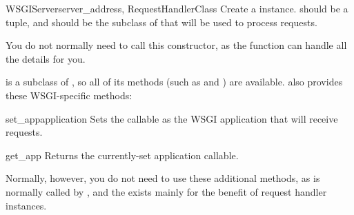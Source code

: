 \begin{classdesc}{WSGIServer}{server_address, RequestHandlerClass}
Create a  instance.   should be
a  tuple, and  should be
the subclass of  that will
be used to process requests.

You do not normally need to call this constructor, as the
 function can handle all the details for you.

 is a subclass
of , so all of its methods (such as
 and ) are available.
 also provides these WSGI-specific methods:

\begin{methoddesc}{set_app}{application}
Sets the callable  as the WSGI application that will
receive requests.
\end{methoddesc}

\begin{methoddesc}{get_app}{}
Returns the currently-set application callable.
\end{methoddesc}

Normally, however, you do not need to use these additional methods, as
 is normally called by , and
the  exists mainly for the benefit of request handler
instances.
\end{classdesc}



